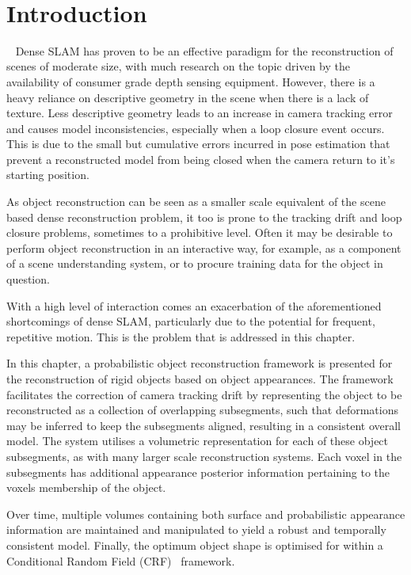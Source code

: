 ~\label{chap:probobj}
\section{Introduction}
~\label{sec:probobj_introduction}
Dense SLAM has proven to be an effective paradigm for the reconstruction of 
scenes of moderate size, with much research on the topic driven by the 
availability of consumer grade depth sensing equipment. However, there is a 
heavy reliance on descriptive geometry in the scene when there is a lack of 
texture. Less descriptive geometry leads to an increase in camera tracking 
error and causes model inconsistencies, especially when a loop closure event 
occurs. This is due to the small but cumulative errors incurred in pose 
estimation that prevent a reconstructed model from being closed when the 
camera return to it's starting position.

As object reconstruction can be seen as a smaller scale equivalent of the scene
based dense reconstruction problem, it too is prone to the tracking drift and
loop closure problems, sometimes to a prohibitive level. Often it may be
desirable to perform object reconstruction in an interactive way, for example,
as a component of a scene understanding system, or to procure training data for
the object in question.

With a high level of interaction comes an exacerbation of the aforementioned
shortcomings of dense SLAM, particularly due to the potential for frequent,
repetitive motion. This is the problem that is addressed in this chapter.

In this chapter, a probabilistic object reconstruction framework is presented
for the reconstruction of rigid objects based on object appearances.
The framework facilitates the correction of camera tracking drift by
representing the object to be reconstructed as a collection of overlapping
subsegments, such that deformations may be inferred to keep the subsegments
aligned, resulting in a consistent overall model. The system utilises a
volumetric representation for each of these object subsegments, as with many
larger scale reconstruction systems. Each voxel in the subsegments has
additional appearance posterior information pertaining to the voxels membership
of the object.

Over time, multiple volumes containing both surface and probabilistic appearance
information are maintained and manipulated to yield a robust and temporally
consistent model. Finally, the optimum object shape is optimised for within a 
Conditional Random Field (CRF)~\cite{BishopPRML} framework.

